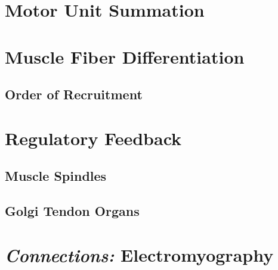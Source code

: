 \section{Motor Unit Summation}



\section{Muscle Fiber Differentiation}

\subsection{Order of Recruitment}

\section{Regulatory Feedback}

\subsection{Muscle Spindles}

\subsection{Golgi Tendon Organs}

\section{\textit{Connections:} Electromyography}

\printbibliography[heading=subbibintoc]